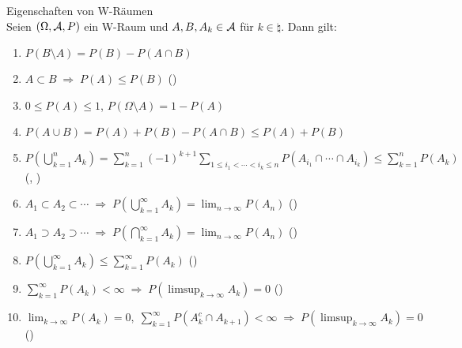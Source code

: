 \begin{Satz}{Eigenschaften von W-Räumen}\\
    Seien $(\Omega, \mathcal{A}, P)$ ein W-Raum und $A, B, A_k \in \mathcal{A}$ für $k \in \natural$. Dann gilt:
    \begin{enumerate}
        \item
        $P(B \setminus A) = P(B) - P(A \cap B)$
        
        \item
        $A \subset B \;\Rightarrow\; P(A) \le P(B)$
        ()
        
        \item
        $0 \le P(A) \le 1$, $P(\Omega \setminus A) = 1 - P(A)$
        
        \item
        $P(A \cup B) = P(A) + P(B) - P(A \cap B) \le P(A) + P(B)$
        
        \item
        $P(\bigcup_{k=1}^n A_k) = \sum_{k=1}^n (-1)^{k+1} \sum_{1 \le i_1 < \dotsb < i_k \le n}
        P(A_{i_1} \cap \dotsb \cap A_{i_k}) \le \sum_{k=1}^n P(A_k)$\\
        (,
        )
        
        \item
        $A_1 \subset A_2 \subset \dotsb \;\Rightarrow\;
        P(\bigcup_{k=1}^\infty A_k) = \lim_{n \to \infty} P(A_n)$
        ()
        
        \item
        $A_1 \supset A_2 \supset \dotsb \;\Rightarrow\;
        P(\bigcap_{k=1}^\infty A_k) = \lim_{n \to \infty} P(A_n)$
        ()
        
        \item
        $P(\bigcup_{k=1}^\infty A_k) \le \sum_{k=1}^\infty P(A_k)$
        ()
        
        \item
        $\sum_{k=1}^\infty P(A_k) < \infty \;\Rightarrow\; P(\limsup_{k \to \infty} A_k) = 0$
        ()
        
        \item
        $\lim_{k \to \infty} P(A_k) = 0,\; \sum_{k=1}^\infty P(A_k^c \cap A_{k+1}) < \infty
        \;\Rightarrow\; P(\limsup_{k \to \infty} A_k) = 0$\\
        ()
    \end{enumerate}
\end{Satz}

